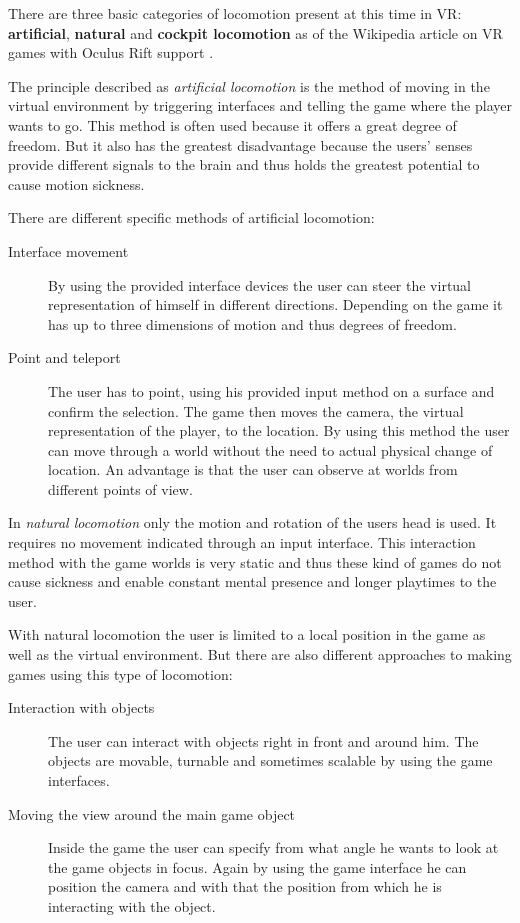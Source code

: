 There are three basic categories of locomotion present at this time in VR: 
\textbf{artificial}, \textbf{natural} and \textbf{cockpit locomotion} as of the Wikipedia article on VR games with Oculus Rift support \cite{wiki:vrOculus}.

The principle described as \textit{artificial locomotion} is the method of 
moving in the virtual environment by triggering interfaces and telling the game 
where the player wants to go. This method is often used because it offers a great 
degree of freedom. But it also has the greatest disadvantage because the users' 
senses provide different signals to the brain and thus holds the greatest 
potential to cause motion sickness.

There are different specific methods of artificial locomotion:
\begin{description}
	\item[Interface movement]By using the provided interface devices the user 
	can steer the virtual representation of himself in different directions. 
	Depending on the game it has up to three dimensions of motion and thus 
	degrees of freedom.
	\item[Point and teleport]The user has to point, using his provided input 
	method on a surface and confirm the selection. The 
	game then moves the camera, the virtual representation of the player, to the 
	location. By using this method the user can move through a world without 
	the need to actual physical change of location. An advantage is that 
	the user can observe at worlds from different points of view.
\end{description}

In \textit{natural locomotion} only the motion and rotation of the users head is used. It requires no movement indicated through an input interface. This interaction method with the game worlds is very static and thus these kind of games do not cause sickness and enable constant mental presence and longer playtimes to the user.

With natural locomotion the user is limited to a local position in the game as well as the virtual environment. But there are also different approaches to making games using this type of locomotion:
\begin{description}
	\item[Interaction with objects]The user can interact with objects right in 
	front and around him. The objects are movable, turnable and sometimes 
	scalable by using the game interfaces.
	\item[Moving the view around the main game object]Inside the game the user can 
	specify from what angle he wants to look at the game objects in focus. 
	Again by using the game interface he can position the camera and with that 
	the position from which he is interacting with the object.
\end{description}

